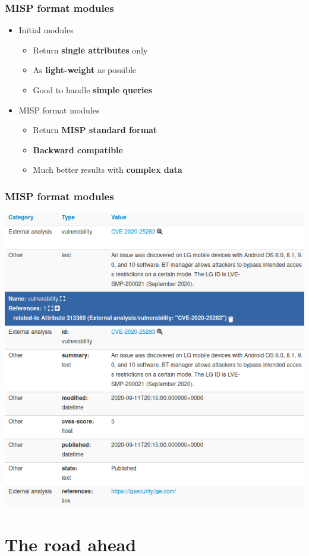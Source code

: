 \begin{frame}
\frametitle{MISP format modules}
\begin{itemize}
    \item Initial modules
    \begin{itemize}
        \item Return {\bf single attributes} only
        \item As {\bf light-weight} as possible
        \item Good to handle {\bf simple queries}
    \end{itemize}
    \item MISP format modules
    \begin{itemize}
        \item Return {\bf MISP standard format}
        \item {\bf Backward compatible}
        \item Much better results with {\bf complex data}
    \end{itemize}
\end{itemize}
\end{frame}

\begin{frame}
\frametitle{MISP format modules}
\begin{center}
    \includegraphics[width=0.7\linewidth]{cve_module.png}
\end{center}
\end{frame}

\section{The road ahead}

